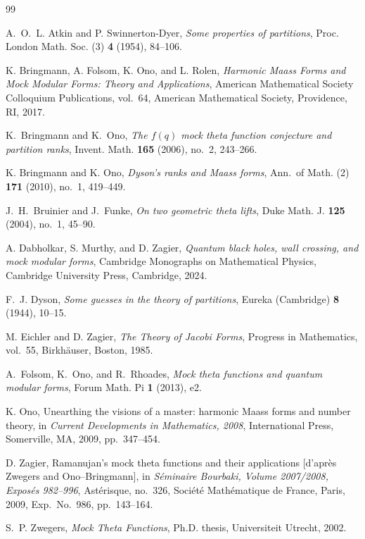 \documentclass[12pt]{amsart}
\numberwithin{equation}{section}
\begin{document}
\begin{thebibliography}{99}

A.~O.~L. Atkin and P. Swinnerton-Dyer,
\emph{Some properties of partitions},
Proc. London Math. Soc. (3) \textbf{4} (1954), 84--106.

K. Bringmann, A. Folsom, K. Ono, and L. Rolen,
\emph{Harmonic Maass Forms and Mock Modular Forms: Theory and Applications},
American Mathematical Society Colloquium Publications, vol.~64,
American Mathematical Society, Providence, RI, 2017.

K.~Bringmann and K.~Ono,
\emph{The $f(q)$ mock theta function conjecture and partition ranks},
Invent. Math. \textbf{165} (2006), no.~2, 243--266.

K. Bringmann and K. Ono,
\emph{Dyson's ranks and Maass forms},
Ann.\ of Math. (2) \textbf{171} (2010), no.~1, 419--449.

J.~H.~Bruinier and J.~Funke,
\emph{On two geometric theta lifts}, Duke Math. J. \textbf{125} (2004), no.~1, 45--90.

A. Dabholkar, S. Murthy, and D. Zagier,
\emph{Quantum black holes, wall crossing, and mock modular forms},
Cambridge Monographs on Mathematical Physics, Cambridge University Press, Cambridge, 2024.

F.~J. Dyson,
\emph{Some guesses in the theory of partitions},
Eureka (Cambridge) \textbf{8} (1944), 10--15.

M. Eichler and D. Zagier,
\emph{The Theory of Jacobi Forms},
Progress in Mathematics, vol.~55, Birkh\"auser, Boston, 1985.

A.~Folsom, K.~Ono, and R.~Rhoades,
\emph{Mock theta functions and quantum modular forms},
Forum Math. Pi \textbf{1} (2013), e2.


K. Ono,
Unearthing the visions of a master: harmonic Maass forms and number theory,
in \emph{Current Developments in Mathematics, 2008},
International Press, Somerville, MA, 2009, pp.~347--454.

D. Zagier,
Ramanujan's mock theta functions and their applications
[d'apr\`es Zwegers and Ono--Bringmann],
in \emph{S\'eminaire Bourbaki, Volume 2007/2008, Expos\'es 982--996},
Ast\'erisque, no.~326, Soci\'et\'e Math\'ematique de France, Paris, 2009,
Exp.~No.~986, pp.~143--164.



S.~P. Zwegers,
\emph{Mock Theta Functions},
Ph.D. thesis, Universiteit Utrecht, 2002.

\end{thebibliography}
\end{document}
